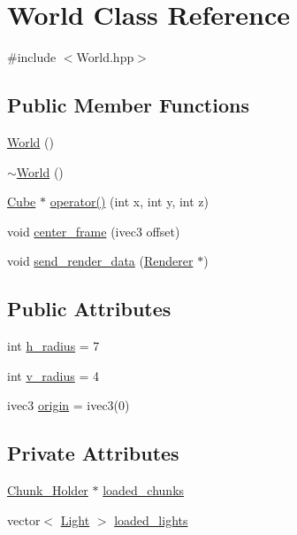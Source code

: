 \hypertarget{classWorld}{}\section{World Class Reference}
\label{classWorld}


{\ttfamily \#include $<$World.\+hpp$>$}

\subsection*{Public Member Functions}
\begin{DoxyCompactItemize}
\item 
\mbox{\hyperlink{classWorld_afa39d4e6f714a7a3691ac0c656f5e8a8}{World}} ()
\item 
\mbox{\hyperlink{classWorld_a8c73fba541a5817fff65147ba47cd827}{$\sim$\+World}} ()
\item 
\mbox{\hyperlink{classCube}{Cube}} $\ast$ \mbox{\hyperlink{classWorld_ade33d093b4560af74cec4fa9264cf078}{operator()}} (int x, int y, int z)
\item 
void \mbox{\hyperlink{classWorld_a867700693b18b37cc9b5a1b8ba818286}{center\+\_\+frame}} (ivec3 offset)
\item 
void \mbox{\hyperlink{classWorld_af79323774823279380a7db9d61ed8028}{send\+\_\+render\+\_\+data}} (\mbox{\hyperlink{classRenderer}{Renderer}} $\ast$)
\end{DoxyCompactItemize}
\subsection*{Public Attributes}
\begin{DoxyCompactItemize}
\item 
int \mbox{\hyperlink{classWorld_aeb621b5ca0eba8ee3d0a1d2bfa11b278}{h\+\_\+radius}} = 7
\item 
int \mbox{\hyperlink{classWorld_a055ae0d6d9a2a5f0cc891cc77157a48a}{v\+\_\+radius}} = 4
\item 
ivec3 \mbox{\hyperlink{classWorld_a832a85c0faf5e0e71a26265e1d893285}{origin}} = ivec3(0)
\end{DoxyCompactItemize}
\subsection*{Private Attributes}
\begin{DoxyCompactItemize}
\item 
\mbox{\hyperlink{classChunk__Holder}{Chunk\+\_\+\+Holder}} $\ast$ \mbox{\hyperlink{classWorld_a712003d390612b1c123013db8dcabc75}{loaded\+\_\+chunks}}
\item 
vector$<$ \mbox{\hyperlink{structLight}{Light}} $>$ \mbox{\hyperlink{classWorld_a747aff1feb1b8dfd17d400bef91f2183}{loaded\+\_\+lights}}
\end{DoxyCompactItemize}


